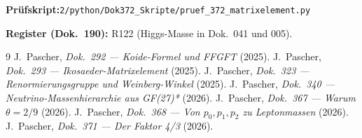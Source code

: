 \medskip
\noindent\textbf{Prüfskript:}\newline\texttt{2/python/Dok372\_Skripte/pruef\_372\_matrixelement.py}

\medskip
\noindent\textbf{Register (Dok.~190):} R122 (Higgs-Masse in Dok.~041 und 005).

\begin{thebibliography}{9}
 J.~Pascher, \emph{Dok.~292 — Koide-Formel und FFGFT} (2025).
 J.~Pascher, \emph{Dok.~293 — Ikosaeder-Matrixelement} (2025).
 J.~Pascher, \emph{Dok.~323 — Renormierungsgruppe und Weinberg-Winkel} (2025).
 J.~Pascher, \emph{Dok.~340 — Neutrino-Massenhierarchie aus GF(27)*} (2026).
 J.~Pascher, \emph{Dok.~367 — Warum $\theta = 2/9$} (2026).
 J.~Pascher, \emph{Dok.~368 — Von $p_0,p_1,p_2$ zu Leptonmassen} (2026).
 J.~Pascher, \emph{Dok.~371 — Der Faktor 4/3} (2026).
\end{thebibliography}
